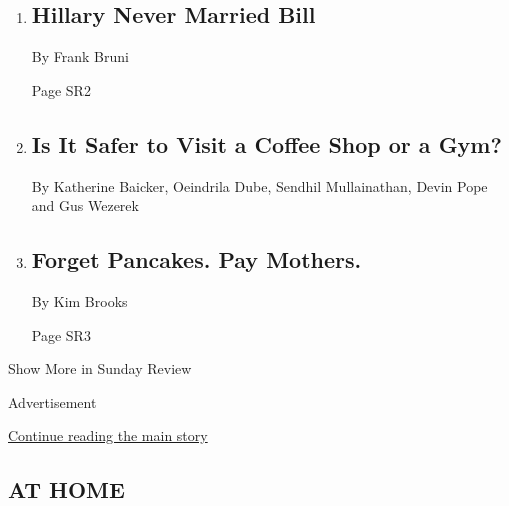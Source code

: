 \begin{enumerate}
\def\labelenumi{\arabic{enumi}.}
\item
  \href{/2020/05/09/opinion/sunday/rodham-sittenfeld-hillary-clinton.html}{}

  \hypertarget{hillary-never-married-bill}{%
  \subsection{Hillary Never Married
  Bill}\label{hillary-never-married-bill}}

  By Frank Bruni

  Page SR2
\item
  \href{/interactive/2020/05/06/opinion/coronavirus-us-reopen.html}{}

  \hypertarget{is-it-safer-to-visit-a-coffee-shop-or-a-gym}{%
  \subsection{Is It Safer to Visit a Coffee Shop or a
  Gym?}\label{is-it-safer-to-visit-a-coffee-shop-or-a-gym}}

  By Katherine Baicker, Oeindrila Dube, Sendhil Mullainathan, Devin Pope
  and Gus Wezerek
\item
  \href{/2020/05/08/opinion/sunday/women-housework-coronavirus-mothers-day.html}{}

  \hypertarget{forget-pancakes-pay-mothers}{%
  \subsection{Forget Pancakes. Pay
  Mothers.}\label{forget-pancakes-pay-mothers}}

  By Kim Brooks

  Page SR3
\end{enumerate}

Show More in Sunday Review

Advertisement

\protect\hyperlink{after-mid5}{Continue reading the main story}

\hypertarget{at-home}{%
\subsection{AT HOME}\label{at-home}}

